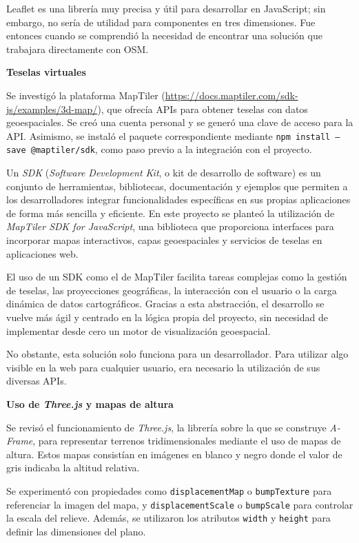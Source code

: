 \documentclass[a4paper, 12pt]{book}
\begin{document}
Leaflet es una librería muy precisa y útil para desarrollar en JavaScript; sin embargo, no sería de utilidad para componentes en tres dimensiones. Fue entonces cuando se comprendió la necesidad de encontrar una solución que trabajara directamente con OSM.

\vspace{0.5em}
\textbf{Teselas virtuales}

Se investigó la plataforma MapTiler (\url{https://docs.maptiler.com/sdk-js/examples/3d-map/}), que ofrecía APIs para obtener teselas con datos geoespaciales. Se creó una cuenta personal y se generó una clave de acceso para la API. Asimismo, se instaló el paquete correspondiente mediante \texttt{npm install --save @maptiler/sdk}, como paso previo a la integración con el proyecto.

Un \textit{SDK} (\textit{Software Development Kit}, o kit de desarrollo de software) es un conjunto de herramientas, bibliotecas, documentación y ejemplos que permiten a los desarrolladores integrar funcionalidades específicas en sus propias aplicaciones de forma más sencilla y eficiente. En este proyecto se planteó la utilización de \textit{MapTiler SDK for JavaScript}, una biblioteca que proporciona interfaces para incorporar mapas interactivos, capas geoespaciales y servicios de teselas en aplicaciones web.

El uso de un SDK como el de MapTiler facilita tareas complejas como la gestión de teselas, las proyecciones geográficas, la interacción con el usuario o la carga dinámica de datos cartográficos. Gracias a esta abstracción, el desarrollo se vuelve más ágil y centrado en la lógica propia del proyecto, sin necesidad de implementar desde cero un motor de visualización geoespacial.

No obstante, esta solución solo funciona para un desarrollador. Para utilizar algo visible en la web para cualquier usuario, era necesario la utilización de sus diversas APIs.

\vspace{0.5em}
\textbf{Uso de \textit{Three.js} y mapas de altura}

Se revisó el funcionamiento de \textit{Three.js}, la librería sobre la que se construye \textit{A-Frame}, para representar terrenos tridimensionales mediante el uso de mapas de altura. Estos mapas consistían en imágenes en blanco y negro donde el valor de gris indicaba la altitud relativa.

Se experimentó con propiedades como \texttt{displacementMap} o \texttt{bumpTexture} para referenciar la imagen del mapa, y \texttt{displacementScale} o \texttt{bumpScale} para controlar la escala del relieve. Además, se utilizaron los atributos \texttt{width} y \texttt{height} para definir las dimensiones del plano.
\end{document}
